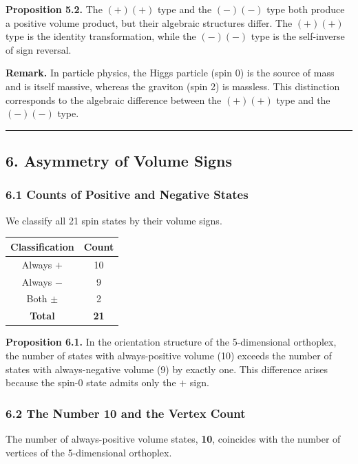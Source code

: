\documentclass[a4paper,11pt]{article}
\newcounter{none}
\begin{document}
\textbf{Proposition 5.2.} The $(+)(+)$ type and the $(-)(-) $ type both produce a positive volume product, but their algebraic structures differ. The $(+)(+)$ type is the identity transformation, while the $(-)(-) $ type is the self-inverse of sign reversal.

\textbf{Remark.} In particle physics, the Higgs particle (spin 0) is the source of mass and is itself massive, whereas the graviton (spin 2) is massless. This distinction corresponds to the algebraic difference between the $(+)(+)$ type and the $(-)(-) $ type.

\begin{center}\rule{0.5\linewidth}{0.5pt}\end{center}

\subsection*{6. Asymmetry of Volume Signs}

\subsubsection*{6.1 Counts of Positive and Negative States}

We classify all 21 spin states by their volume signs.

{\def\LTcaptype{none}
\begin{longtable}[]{@{}cc@{}}
\toprule
Classification & Count \\
\midrule
\endhead
\bottomrule
\endlastfoot
Always $+$ & 10 \\
Always $-$ & 9 \\
Both $\pm$ & 2 \\
\textbf{Total} & \textbf{21} \\
\end{longtable}
}

\textbf{Proposition 6.1.} In the orientation structure of the 5-dimensional orthoplex, the number of states with always-positive volume (10) exceeds the number of states with always-negative volume (9) by exactly one. This difference arises because the spin-0 state admits only the $+$ sign.

\subsubsection*{6.2 The Number 10 and the Vertex Count}

The number of always-positive volume states, \textbf{10}, coincides with the number of vertices of the 5-dimensional orthoplex.
\end{document}
